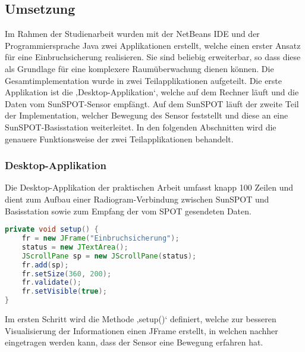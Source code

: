 \subsection{Umsetzung}\label{s:Umsetzung}

Im Rahmen der Studienarbeit wurden mit der NetBeans IDE und der Programmiersprache Java zwei Applikationen erstellt, welche einen erster Ansatz für eine Einbruchsicherung realisieren. Sie sind beliebig erweiterbar, so dass diese als Grundlage für eine komplexere Raumüberwachung dienen können. Die Gesamtimplementation wurde in zwei Teilapplikationen aufgeteilt. Die erste Applikation ist die ‚Desktop-Applikation‘, welche auf dem Rechner läuft und die Daten vom SunSPOT-Sensor empfängt. Auf dem SunSPOT läuft der zweite Teil der Implementation, welcher Bewegung des Sensor feststellt und diese an eine SunSPOT-Basisstation weiterleitet. In den folgenden Abschnitten wird die genauere Funktionsweise der zwei Teilapplikationen behandelt.

\subsubsection{Desktop-Applikation}\label{s:Desktop-Applikation}

Die Desktop-Applikation der praktischen Arbeit umfasst knapp 100 Zeilen und dient zum Aufbau einer Radiogram-Verbindung zwischen SunSPOT und Basisstation sowie zum Empfang der vom SPOT gesendeten Daten. 

\begin{lstlisting}[language=Java,caption={Ausschnitt aus der setup()-Methode},label=lst:setup,frame=single] 
private void setup() {
	fr = new JFrame("Einbruchsicherung");
	status = new JTextArea();
	JScrollPane sp = new JScrollPane(status);
	fr.add(sp);
	fr.setSize(360, 200);
	fr.validate();
	fr.setVisible(true);
}           
\end{lstlisting}

Im ersten Schritt wird die Methode ‚setup()‘ definiert, welche zur besseren Visualisierung der Informationen einen JFrame erstellt, in welchen nachher eingetragen werden kann, dass der Sensor eine Bewegung erfahren hat.
